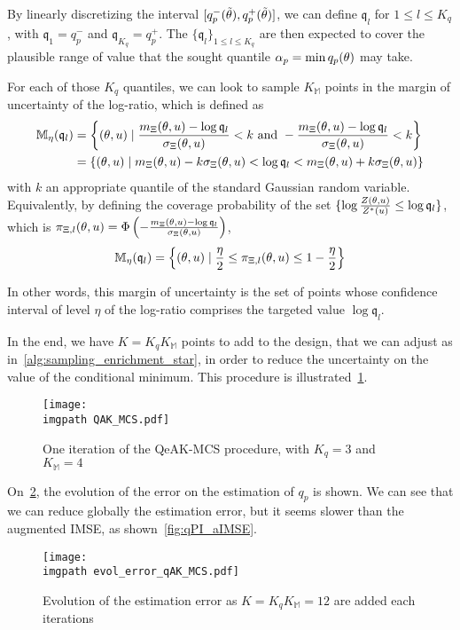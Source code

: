 \documentclass[../../Main_ManuscritThese.tex]{subfiles}
\newcommand\imgpath{/home/victor/acadwriting/Manuscrit/Text/Chapter4/img/}
\begin{document}
By linearly discretizing the interval
$\interval{q^-_p(\tilde{\kk})}{q^+_p(\tilde{\kk})}$, we can define
$\mathfrak{q}_l$ for $1 \leq l \leq K_q$, with
$\mathfrak{q}_1 = q^-_p$ and $\mathfrak{q}_{K_q} = q^+_p$. The
$\{\mathfrak{q}_l\}_{1\leq l \leq K_q}$ are then expected to cover the
plausible range of value that the sought quantile
$\alpha_p = \min q_p(\theta)$ may take.

For each of those $K_q$ quantiles, we can look to sample
$K_{\mathbb{M}}$ points in the margin of uncertainty of the log-ratio,
which is defined as
\begin{align}
  \mathbb{M}_{\eta}(\mathfrak{q}_l)  &= \left\{ (\theta, u) \mid \frac{m_{\Xi}(\theta, u) - \log \mathfrak{q}_l}{\sigma_{\Xi}(\theta, u)}< k \text{ and } -\frac{m_{\Xi}(\theta, u)-\log \mathfrak{q}_l}{\sigma_\Xi(\theta, u)}  <  k\right\} \\
                                     &= \{(\theta, u) \mid m_{\Xi}(\theta,u) - k\sigma_{\Xi}(\theta, u) < \log \mathfrak{q}_l < m_{\Xi}(\theta, u) + k\sigma_{\Xi}(\theta, u)\}
\end{align}
with $k$ an appropriate quantile of the standard Gaussian random
variable. Equivalently, by defining the coverage probability of the
set $\{\log \frac{Z(\theta,u)}{Z^*(u)}\leq \log \mathfrak{q}_l\}$,
which is
$\pi_{\Xi,l}(\theta, u) = \Phi\left(-\frac{m_{\Xi}(\theta, u) - \log
    \mathfrak{q}_l}{\sigma_{\Xi}(\theta, u)}\right)$,
\begin{equation}
  \mathbb{M}_{\eta}(\mathfrak{q}_l) = \left\{(\theta, u) \mid \frac{\eta}{2}\leq\pi_{\Xi,l}(\theta, u) \leq 1-\frac{\eta}{2}\right\}
\end{equation}

In other words, this margin of uncertainty is the set of points whose
confidence interval of level $\eta$ of the log-ratio comprises the
targeted value $\log \mathfrak{q}_l$.

In the end, we have $K = K_qK_{\mathbb{M}}$ points to add to the
design, that we can adjust as in~\cref{alg:sampling_enrichment_star},
in order to reduce the uncertainty on the value of the conditional
minimum. This procedure is illustrated~\cref{fig:QAK_MCS}.
\begin{figure}[ht]
  \centering
  \texttt{[image: \\imgpath QAK\_MCS.pdf]}
  \caption{\label{fig:QAK_MCS} One iteration of the QeAK-MCS procedure, with $K_q=3$ and $K_{\mathbb{M}}=4$}
\end{figure}
On~\cref{fig:evol_error_qAK_MCS}, the evolution of the error on the
estimation of $q_p$ is shown. We can see that we can reduce globally
the estimation error, but it seems slower than the augmented IMSE, as
shown~\cref{fig:qPI_aIMSE}.
\begin{figure}[ht]
  \centering
  \texttt{[image: \\imgpath evol\_error\_qAK\_MCS.pdf]}
  \caption[Evolution of the estimation
    error for $K=K_qK_{\mathbb{M}}=12$]{\label{fig:evol_error_qAK_MCS} Evolution of the estimation
    error as $K=K_qK_{\mathbb{M}}=12$ are added each iterations}
\end{figure}
\end{document}
